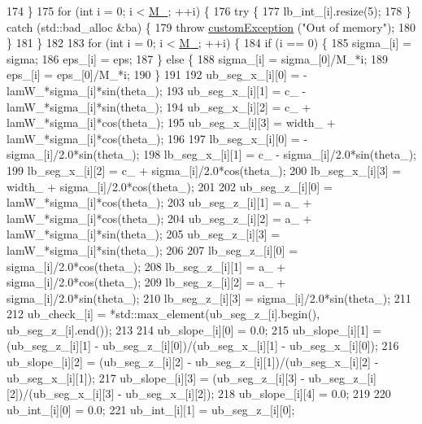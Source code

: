 \begin{DoxyCode}
174     \}
175     \textcolor{keywordflow}{for} (\textcolor{keywordtype}{int} i = 0; i < \hyperlink{classbarrier_a274cf283ffc97c22ffa9a4258369c400}{M\_}; ++i) \{
176         \textcolor{keywordflow}{try} \{
177             lb\_int\_[i].resize(5);
178         \} \textcolor{keywordflow}{catch} (std::bad\_alloc &ba) \{
179             \textcolor{keywordflow}{throw} \hyperlink{classcustom_exception}{customException} (\textcolor{stringliteral}{"Out of memory"});
180         \}
181     \}
182 
183     \textcolor{keywordflow}{for} (\textcolor{keywordtype}{int} i = 0; i < \hyperlink{classbarrier_a274cf283ffc97c22ffa9a4258369c400}{M\_}; ++i) \{
184         \textcolor{keywordflow}{if} (i == 0) \{
185             sigma\_[i] = sigma;
186             eps\_[i] = eps;
187         \} \textcolor{keywordflow}{else} \{
188             sigma\_[i] = sigma\_[0]/M\_*i;
189             eps\_[i] = eps\_[0]/M\_*i;
190         \}
191 
192         ub\_seg\_x\_[i][0] = -lamW\_*sigma\_[i]*sin(theta\_);
193         ub\_seg\_x\_[i][1] = c\_ - lamW\_*sigma\_[i]*sin(theta\_);
194         ub\_seg\_x\_[i][2] = c\_ + lamW\_*sigma\_[i]*cos(theta\_);
195         ub\_seg\_x\_[i][3] = width\_ + lamW\_*sigma\_[i]*cos(theta\_);
196 
197         lb\_seg\_x\_[i][0] = -sigma\_[i]/2.0*sin(theta\_);
198         lb\_seg\_x\_[i][1] = c\_ - sigma\_[i]/2.0*sin(theta\_);
199         lb\_seg\_x\_[i][2] = c\_ + sigma\_[i]/2.0*cos(theta\_);
200         lb\_seg\_x\_[i][3] = width\_ + sigma\_[i]/2.0*cos(theta\_);
201 
202         ub\_seg\_z\_[i][0] = lamW\_*sigma\_[i]*cos(theta\_);
203         ub\_seg\_z\_[i][1] = a\_ + lamW\_*sigma\_[i]*cos(theta\_);
204         ub\_seg\_z\_[i][2] = a\_ + lamW\_*sigma\_[i]*sin(theta\_);
205         ub\_seg\_z\_[i][3] = lamW\_*sigma\_[i]*sin(theta\_);
206 
207         lb\_seg\_z\_[i][0] = sigma\_[i]/2.0*cos(theta\_);
208         lb\_seg\_z\_[i][1] = a\_ + sigma\_[i]/2.0*cos(theta\_);
209         lb\_seg\_z\_[i][2] = a\_ + sigma\_[i]/2.0*sin(theta\_);
210         lb\_seg\_z\_[i][3] = sigma\_[i]/2.0*sin(theta\_);
211 
212         ub\_check\_[i] = *std::max\_element(ub\_seg\_z\_[i].begin(), ub\_seg\_z\_[i].end());
213 
214         ub\_slope\_[i][0] = 0.0;
215         ub\_slope\_[i][1] = (ub\_seg\_z\_[i][1] - ub\_seg\_z\_[i][0])/(ub\_seg\_x\_[i][1] - ub\_seg\_x\_[i][0]);
216         ub\_slope\_[i][2] = (ub\_seg\_z\_[i][2] - ub\_seg\_z\_[i][1])/(ub\_seg\_x\_[i][2] - ub\_seg\_x\_[i][1]);
217         ub\_slope\_[i][3] = (ub\_seg\_z\_[i][3] - ub\_seg\_z\_[i][2])/(ub\_seg\_x\_[i][3] - ub\_seg\_x\_[i][2]);
218         ub\_slope\_[i][4] = 0.0;
219 
220         ub\_int\_[i][0] = 0.0;
221         ub\_int\_[i][1] = ub\_seg\_z\_[i][0];

\end{DoxyCode}
